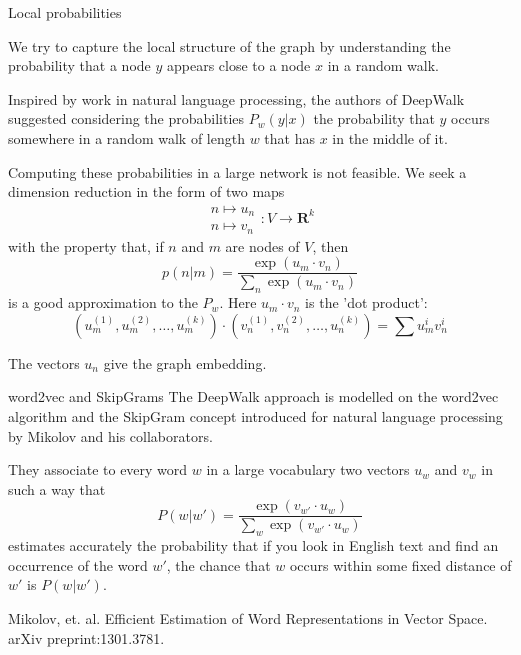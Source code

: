 \documentclass{beamer}
\begin{document}
\begin{frame}{Local probabilities}

  We try to capture the local structure of the graph by understanding the probability that a node $y$ appears close to a node $x$ in a random walk.

  \bigskip\noindent
  Inspired by work in natural language processing, the authors of DeepWalk suggested considering the probabilities
  $P_{w}(y|x)$   the probability that $y$ occurs somewhere in a random walk of length $w$ that has $x$ in the middle of  it.

\end{frame}
\begin{frame}

  Computing these probabilities in a large network is not feasible. We seek a dimension reduction
  in the form of two maps $$\begin{matrix}n\mapsto u_n \\ n\mapsto v_n\end{matrix}:V\to \mathbf{R}^{k}$$
  with the property that, if $n$ and $m$ are nodes of $V$, then 
  $$
  p(n|m)=\frac{\exp(u_m\cdot v_n)}{\sum_{n} \exp(u_m\cdot v_n)}
  $$
  is a good approximation to the $P_{w}$. Here $u_m\cdot v_n$ is the 'dot product':
  $$
  (u_m^{(1)},u_m^{(2)},\ldots,u_m^{(k)})\cdot (v_n^{(1)},v_n^{(2)},\ldots,u_n^{(k)})=\sum u_{m}^{i}v_{n}^{i}
  $$
  
  The vectors $u_n$ give the graph embedding.

\end{frame}
\begin{frame}{word2vec and SkipGrams}
  The DeepWalk approach is modelled on the word2vec algorithm and the SkipGram concept introduced for natural language processing by Mikolov and his collaborators.

  They associate to every word $w$ in a large vocabulary two vectors $u_w$ and $v_w$ in such a way
  that
  $$
  P(w|w')=\frac{\exp(v_{w'}\cdot u_w)}{\sum_{w} \exp (v_{w'}\cdot u_w)}
  $$
  estimates accurately the probability that if you look in English text and find an occurrence of the word $w'$,
  the chance that $w$ occurs within some fixed distance of $w'$ is $P(w|w')$.
  
  \begin{block}{}
    \tiny{
      Mikolov, et. al. Efficient Estimation of Word Representations in Vector Space. arXiv preprint:1301.3781.
    }
  \end{block}
\end{frame}
\end{document}
